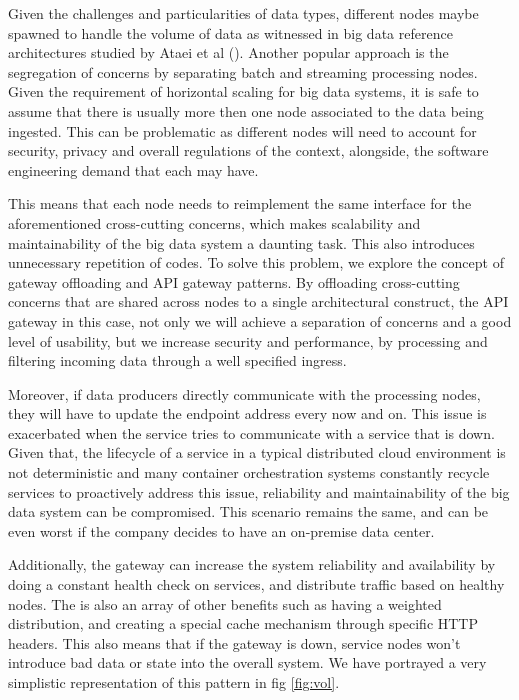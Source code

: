 \documentclass[conference]{IEEEtran}
\begin{document}
Given the challenges and particularities of data types, different nodes maybe spawned to handle the volume of data as witnessed in big data reference architectures studied by Ataei et al (\cite{ataei2020big}). Another popular approach is the segregation of concerns by separating batch and streaming processing nodes. Given the requirement of horizontal scaling for big data systems, it is safe to assume that there is usually more then one node associated to the data being ingested. This can be problematic as different nodes will need to account for security, privacy and overall regulations of the context, alongside, the software engineering demand that each may have. 

This means that each node needs to reimplement the same interface for the aforementioned cross-cutting concerns, which makes scalability and maintainability of the big data system a daunting task. This also introduces unnecessary repetition of codes. To solve this problem, we explore the concept of gateway offloading and API gateway patterns. By offloading cross-cutting concerns that are shared across nodes to a single architectural construct, the API gateway in this case, not only we will achieve a separation of concerns and a good level of usability, but we increase security and performance, by processing and filtering incoming data through a well specified ingress. 

Moreover, if data producers directly communicate with the processing nodes, they will have to update the endpoint address every now and on. This issue is exacerbated when the service tries to communicate with a service that is down. Given that, the lifecycle of a service in a typical distributed cloud environment is not deterministic and many container orchestration systems constantly recycle services to proactively address this issue, reliability and maintainability of the big data system can be compromised. This scenario remains the same, and can be even worst if the company decides to have an on-premise data center. 

Additionally, the gateway can increase the system reliability and availability by doing a constant health check on services, and distribute traffic based on healthy nodes. The is also an array of other benefits such as having a weighted distribution, and creating a special cache mechanism through specific HTTP headers. This also means that if the gateway is down, service nodes won't introduce bad data or state into the overall system. We have portrayed a very simplistic representation of this pattern in fig \ref{fig:vol}. 
\end{document}
